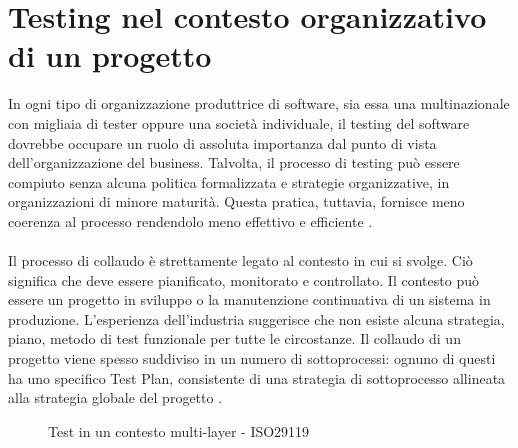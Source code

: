 \documentclass[../main.tex]{subfiles}
\begin{document}
\section{Testing nel contesto organizzativo di un progetto}
In ogni tipo di organizzazione produttrice di software, sia essa una multinazionale con migliaia di tester oppure una società individuale, il testing del software dovrebbe occupare un ruolo di assoluta importanza dal punto di vista dell'organizzazione del business.
Talvolta, il processo di testing può essere compiuto senza alcuna politica formalizzata e strategie organizzative, in organizzazioni di minore maturità. Questa pratica, tuttavia, fornisce meno coerenza al processo rendendolo meno effettivo e efficiente \cite{iso29119}.\paragraph{}
Il processo di collaudo è strettamente legato al contesto in cui si svolge. Ciò significa che deve essere pianificato, monitorato e controllato.
Il contesto può essere un progetto in sviluppo o la manutenzione continuativa di un sistema in produzione. L'esperienza dell'industria suggerisce che non esiste alcuna strategia, piano, metodo di test funzionale per tutte le circostanze.
Il collaudo di un progetto viene spesso suddiviso in un numero di sottoprocessi: ognuno di questi ha uno specifico Test Plan, consistente di una strategia di sottoprocesso allineata alla strategia globale del progetto \cite{iso29119}.
\begin{figure}[H]
\centering
{}
\caption{Test in un contesto multi-layer - ISO29119 \cite{iso29119}}\label{fig:2}
\end{figure}
\end{document}
